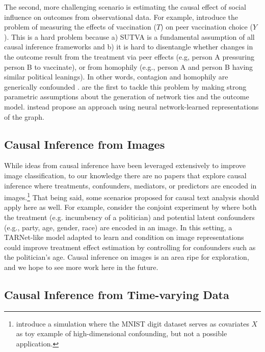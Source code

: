 The second, more challenging scenario is estimating the causal effect of social influence on outcomes from observational data. For example, \citet{Cristali2022UsingEF} introduce the problem of measuring the effects of vaccination ($T$) on peer vaccination choice ($Y$). This is a hard problem because a) SUTVA is a fundamental assumption of all causal inference frameworks and b) it is hard to disentangle whether changes in the outcome result from the treatment via peer effects (e.g, person A pressuring person B to vaccinate), or from homophily (e.g., person A and person B having similar political leanings). In other words, contagion and homophily are generically confounded \citep{shalizithomas2011}. \citet{mcfowland2021} are the first to tackle this problem by making strong parametric assumptions about the generation of network ties and the outcome model. \citet{Cristali2022UsingEF} instead propose an approach using neural network-learned representations of the graph.     

\subsection{Causal Inference from Images}
\label{subsection:images}

While ideas from causal inference have been leveraged extensively to improve image classification, to our knowledge there are no papers that explore causal inference where treatments, confounders, mediators, or predictors are encoded in images.\footnote{\citet{jesson2021quantifying} introduce a simulation where the MNIST digit dataset serves as covariates $X$ as toy example of high-dimensional confounding, but not a possible application.} That being said, some scenarios proposed for causal text analysis should apply here as well. For example, consider the conjoint experiment by \citet{todorov2005inferences} where both the treatment (e.g. incumbency of a politician) and potential latent confounders (e.g., party, age, gender, race) are encoded in an image. In this setting, a TARNet-like model adapted to learn and condition on image representations could improve treatment effect estimation by controlling for confounders such as the politician's age. Causal inference on images is an area ripe for exploration, and we hope to see more work here in the future.

\subsection{Causal Inference from Time-varying Data}
\label{subsection:timevarying}


